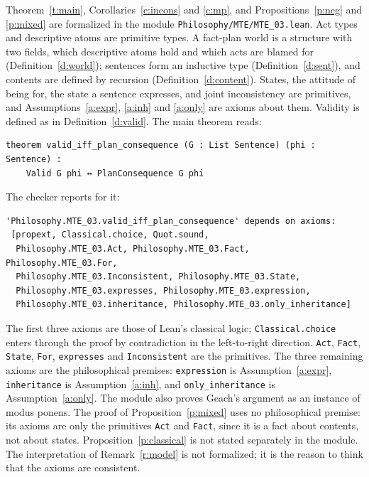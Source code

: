 \documentclass{situationist-preprint}
\begin{document}
Theorem~\ref{t:main}, Corollaries~\ref{c:incons} and \ref{c:mp}, and Propositions~\ref{p:neg} and \ref{p:mixed} are formalized in the module \nolinkurl{Philosophy/MTE/MTE_03.lean}. Act types and descriptive atoms are primitive types. A fact-plan world is a structure with two fields, which descriptive atoms hold and which acts are blamed for (Definition~\ref{d:world}); sentences form an inductive type (Definition~\ref{d:sent}), and contents are defined by recursion (Definition~\ref{d:content}). States, the attitude of being for, the state a sentence expresses, and joint inconsistency are primitives, and Assumptions~\ref{a:expr}, \ref{a:inh} and \ref{a:only} are axioms about them. Validity is defined as in Definition~\ref{d:valid}. The main theorem reads:

\begin{lstlisting}
theorem valid_iff_plan_consequence (G : List Sentence) (phi : Sentence) :
    Valid G phi ↔ PlanConsequence G phi
\end{lstlisting}

The checker reports for it:

\begin{lstlisting}
'Philosophy.MTE_03.valid_iff_plan_consequence' depends on axioms:
 [propext, Classical.choice, Quot.sound,
  Philosophy.MTE_03.Act, Philosophy.MTE_03.Fact, Philosophy.MTE_03.For,
  Philosophy.MTE_03.Inconsistent, Philosophy.MTE_03.State,
  Philosophy.MTE_03.expresses, Philosophy.MTE_03.expression,
  Philosophy.MTE_03.inheritance, Philosophy.MTE_03.only_inheritance]
\end{lstlisting}

The first three axioms are those of Lean's classical logic; \texttt{Classical.choice} enters through the proof by contradiction in the left-to-right direction. \texttt{Act}, \texttt{Fact}, \texttt{State}, \texttt{For}, \texttt{expresses} and \texttt{Inconsistent} are the primitives. The three remaining axioms are the philosophical premises: \texttt{expression} is Assumption~\ref{a:expr}, \texttt{inheritance} is Assumption~\ref{a:inh}, and \texttt{only\_inheritance} is Assumption~\ref{a:only}. The module also proves Geach's argument as an instance of modus ponens. The proof of Proposition~\ref{p:mixed} uses no philosophical premise: its axioms are only the primitives \texttt{Act} and \texttt{Fact}, since it is a fact about contents, not about states. Proposition~\ref{p:classical} is not stated separately in the module. The interpretation of Remark~\ref{r:model} is not formalized; it is the reason to think that the axioms are consistent.
\end{document}
